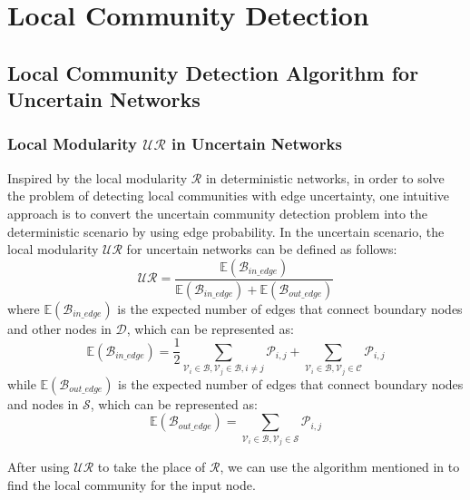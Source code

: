 \documentclass[\main/thesis.tex]{subfiles}
\begin{document}
\chapter{Local Community Detection}
\section{Local Community Detection Algorithm for Uncertain Networks}
\subsection{Local Modularity $\mathcal{UR}$ in Uncertain Networks}
Inspired by the local modularity $\mathcal{R}$ in deterministic networks, in order to solve the problem of detecting local communities with edge uncertainty, one intuitive approach is to convert the uncertain community detection problem into the deterministic scenario by using edge probability. In the uncertain scenario, the local modularity $\mathcal{UR}$ for uncertain networks can be defined as follows:
\begin{equation}
\mathcal{UR} = \frac{\mathbb{E}(\mathcal{B}_{in\_edge})}{\mathbb{E}(\mathcal{B}_{in\_edge})+\mathbb{E}(\mathcal{B}_{out\_edge})}
\label{UR-Local}
\end{equation}
where $\mathbb{E}(\mathcal{B}_{in\_edge})$ is the expected number of edges that connect boundary nodes and other nodes in $\mathcal{D}$, which can be represented as:
\begin{equation}
\mathbb{E}(\mathcal{B}_{in\_edge}) = \frac{1}{2}\sum_{\mathcal{V}_i\in \mathcal{B},\mathcal{V}_j\in \mathcal{B},i\neq j}\mathcal{P}_{i,j}+\sum_{\mathcal{V}_i\in \mathcal{B},\mathcal{V}_j\in \mathcal{C}}\mathcal{P}_{i,j}
\end{equation}
while $\mathbb{E}(\mathcal{B}_{out\_edge})$ is the expected number of edges that connect boundary nodes and nodes in $\mathcal{S}$, which can be represented as:
\begin{equation}
\mathbb{E}(\mathcal{B}_{out\_edge}) = \sum_{\mathcal{V}_i\in \mathcal{B},\mathcal{V}_j\in \mathcal{S}}\mathcal{P}_{i,j}
\end{equation}

After using $\mathcal{UR}$ to take the place of $\mathcal{R}$, we can use the algorithm mentioned in \cite{clauset2005finding,chen2009detecting} to find the local community for the input node. 
\end{document}
